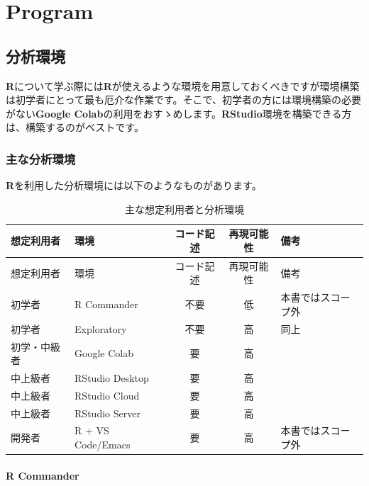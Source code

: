 \documentclass[
  12pt,
]{book}
\begin{document}
\hypertarget{part-program}{%
\part{Program}\label{part-program}}

\hypertarget{ux5206ux6790ux74b0ux5883}{%
\chapter{分析環境}\label{ux5206ux6790ux74b0ux5883}}

\textbf{R}について学ぶ際には\textbf{R}が使えるような環境を用意しておくべきですが環境構築は初学者にとって最も厄介な作業です。そこで、初学者の方には環境構築の必要がない\textbf{Google Colab}の利用をおすゝめします。\textbf{RStudio}環境を構築できる方は、構築するのがベストです。

\hypertarget{ux4e3bux306aux5206ux6790ux74b0ux5883}{%
\section{主な分析環境}\label{ux4e3bux306aux5206ux6790ux74b0ux5883}}

\textbf{R}を利用した分析環境には以下のようなものがあります。

\begin{longtable}[]{@{}llccl@{}}
\caption{主な想定利用者と分析環境}\tabularnewline
\toprule
想定利用者 & 環境 & コード記述 & 再現可能性 & 備考 \\
\midrule
\endfirsthead
\toprule
想定利用者 & 環境 & コード記述 & 再現可能性 & 備考 \\
\midrule
\endhead
初学者 & R Commander & 不要 & 低 & 本書ではスコープ外 \\
初学者 & Exploratory & 不要 & 高 & 同上 \\
初学・中級者 & Google Colab & 要 & 高 & \\
中上級者 & RStudio Desktop & 要 & 高 & \\
中上級者 & RStudio Cloud & 要 & 高 & \\
中上級者 & RStudio Server & 要 & 高 & \\
開発者 & R + VS Code/Emacs & 要 & 高 & 本書ではスコープ外 \\
\bottomrule
\end{longtable}

\hypertarget{r-commander}{%
\subsection{R Commander}\label{r-commander}}
\end{document}
